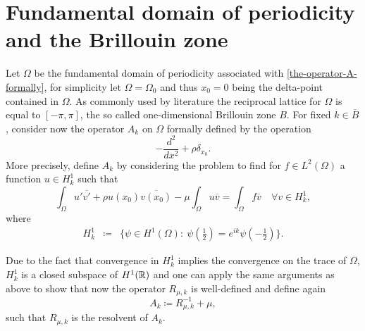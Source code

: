 \chapter{Fundamental domain of periodicity and the Brillouin zone}

Let $\Omega$ be the fundamental domain of periodicity associated with \eqref{the-operator-A-formally}, for simplicity let $\Omega = \Omega_{0}$ and thus $x_{0} = 0$ being the delta-point contained in $\Omega$. As commonly used by literature the reciprocal lattice for $\Omega$ is equal to $[-\pi, \pi]$, the so called one-dimensional Brillouin zone $B$. For fixed $k \in \overline{B}$, consider now the operator $A_{k}$ on $\Omega$ formally defined by the operation
		\[ -\frac{d^{2}}{dx^{2}} + \rho \delta_{x_{0}}. \]
	More precisely, define $A_{k}$ by considering the problem to find for $f \in L^{2}(\Omega)$ a function $u \in H^{1}_{k}$ such that
	\[ \int_{\Omega} u' \overline{v'} + \rho u(x_{0}) \overline{v(x_{0})} - \mu \int_{\Omega} u \overline{v} = \int_{\Omega} f \overline{v} \quad \forall v \in H^{1}_{k}, \]
	where 
	\begin{eqnarray}
		H^{1}_{k} & \coloneqq & \Big\{ \psi \in H^{1}(\Omega): ~ \psi(\frac{1}{2}) = e^{ik} \psi(-\frac{1}{2}) \Big\}. \label{quasi-periodic-condition}	
	\end{eqnarray}

 	Due to the fact that convergence in $H^{1}_{k}$ implies the convergence on the trace of $\Omega$, $H^{1}_{k}$ is a closed subspace of $H^{1}(\mathbb{R})$ and one can apply the same arguments as above to show that now the operator $R_{\mu, k}$ is well-defined and define again %
		\[ A_{k} \coloneqq R_{\mu, k}^{-1} + \mu, \] 
	such that $R_{\mu, k}$ is the resolvent of $A_{k}$.	
		
